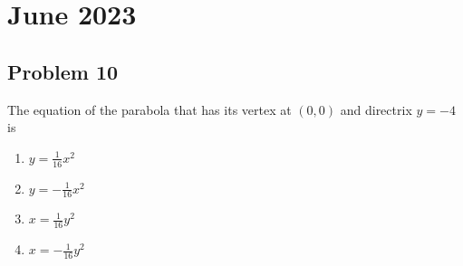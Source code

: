\documentclass{article}
\begin{document}
\section*{June 2023}
\subsection*{Problem 10}
The equation of the parabola that has its vertex at $(0, 0)$ and directrix $y = -4$ is
\begin{enumerate}
    \item $y = \frac{1}{16}x^2$
    \item $y = -\frac{1}{16}x^2$
    \item $x = \frac{1}{16}y^2$
    \item $x = -\frac{1}{16}y^2$
\end{enumerate}

\end{document}
